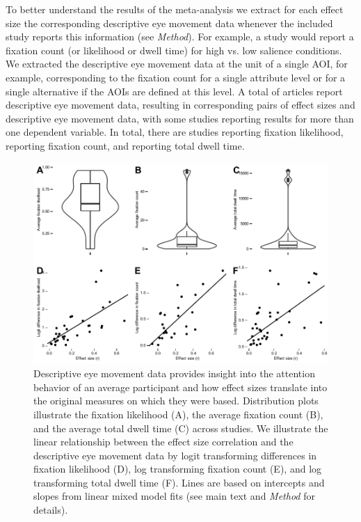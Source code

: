 To better understand the results of the meta-analysis we extract for each effect size the corresponding descriptive eye movement data whenever the included study reports this information (see \textit{Method}). For example, a study would report a fixation count (or likelihood or dwell time) for high vs. low salience conditions. We extracted the descriptive eye movement data at the unit of a single AOI, for example, corresponding to the fixation count for a single attribute level or for a single alternative if the AOIs are defined at this level. A total of \protect{\unskip} articles report descriptive eye movement data, resulting in \protect{\unskip} corresponding pairs of effect sizes and descriptive eye movement data, with some studies reporting results for more than one dependent variable. In total, there are \protect{\unskip} studies reporting fixation likelihood, \protect{\unskip} reporting fixation count, and \protect{\unskip} reporting total dwell time.


\begin{figure}[!h]
\includegraphics{figs/EMtoES.pdf}
\centering
\caption{Descriptive eye movement data provides insight into the attention behavior of an average participant and how effect sizes translate into the original measures on which they were based. Distribution plots illustrate the fixation likelihood (A), the average fixation count (B), and the average total dwell time (C) across studies. We illustrate the linear relationship between the effect size correlation and the descriptive eye movement data by logit transforming differences in fixation likelihood (D), log transforming fixation count (E), and log transforming total dwell time (F). Lines are based on intercepts and slopes from linear mixed model fits (see main text and \textit{Method} for details).}
\label{fig:em_figure}
\end{figure}


